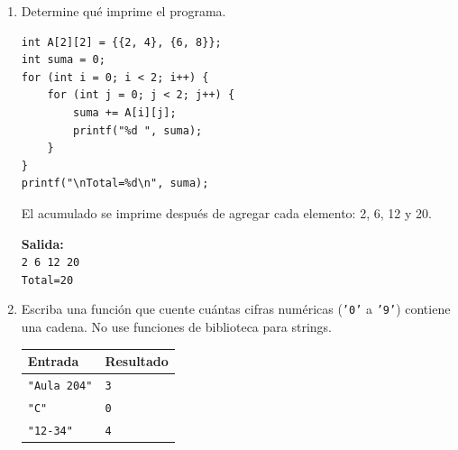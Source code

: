 \begin{enumerate}[label=\textbf{\arabic*.}]
\begin{enumerate}[label=(\alph*)]
\item Escriba la condición que detecta una nota fuera del rango.
\ifpauta\begin{solucionbox}\texttt{nota < 1.0f || nota > 7.0f}. Basta con que se cumpla una de las dos condiciones para que sea inválida.\end{solucionbox}\else\vspace{1.5cm}\fi
\item Escriba el fragmento \texttt{if-else} que imprima si la nota es válida.
\ifpauta\begin{solucionbox}\begin{lstlisting}[style=customc]
if (nota >= 1.0f && nota <= 7.0f) {
    printf("Nota valida\n");
} else {
    printf("Nota invalida\n");
}
\end{lstlisting}\end{solucionbox}\else\vspace{2cm}\fi
\item Clasifique las entradas \texttt{0.9}, \texttt{1.0}, \texttt{5.5} y \texttt{7.1}.
\ifpauta\begin{solucionbox}\texttt{0.9}: inválida; \texttt{1.0}: válida; \texttt{5.5}: válida; \texttt{7.1}: inválida.\end{solucionbox}\else\vspace{2cm}\fi
\end{enumerate}
\newpage
\item Determine qué imprime el programa.
\begin{lstlisting}[style=customc]
int A[2][2] = {{2, 4}, {6, 8}};
int suma = 0;
for (int i = 0; i < 2; i++) {
    for (int j = 0; j < 2; j++) {
        suma += A[i][j];
        printf("%d ", suma);
    }
}
printf("\nTotal=%d\n", suma);
\end{lstlisting}
\ifpauta\begin{solucionbox}El acumulado se imprime después de agregar cada elemento: 2, 6, 12 y 20.\par\textbf{Salida:}\\\texttt{2 6 12 20}\\\texttt{Total=20}\end{solucionbox}\else\vspace{3cm}\fi
\item Escriba una función que cuente cuántas cifras numéricas (\texttt{'0'} a \texttt{'9'}) contiene una cadena. No use funciones de biblioteca para strings.
\begin{center}\begin{tabular}{ll}\toprule\textbf{Entrada} & \textbf{Resultado}\\\midrule\texttt{"Aula 204"} & \texttt{3}\\\texttt{"C"} & \texttt{0}\\\texttt{"12-34"} & \texttt{4}\\\bottomrule\end{tabular}\end{center}

\end{enumerate}
